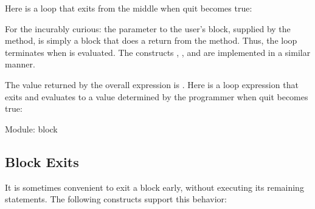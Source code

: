 \documentclass[letterpaper,10pt,english]{sphinxmanual}
\begin{document}
Here is a loop that exits from the middle when quit becomes true:

\begin{sphinxVerbatim}[commandchars=\\\{\}]
\PYG{p}{[}        \PYG{p}{]} 
\end{sphinxVerbatim}

For the incurably curious: the parameter to the user’s block, supplied by the  method, is simply a block that
does a return from the  method. Thus, the loop terminates when  is evaluated. The constructs
, , and  are implemented in a similar manner.

The value returned by the overall  expression is . Here is a loop expression
that exits and evaluates to a value determined by the programmer when quit becomes true:

\begin{sphinxVerbatim}[commandchars=\\\{\}]
\PYG{p}{[}      \PYG{p}{[}    \PYG{p}{]} \PYG{p}{]} 
\end{sphinxVerbatim}

Module: block


\subsection{Block Exits}
\label{\detokenize{blocks:block-exits}}
It is sometimes convenient to exit a block early, without executing its remaining statements. The
following constructs support this behavior:

\begin{sphinxVerbatim}[commandchars=\\\{\}]
\PYG{p}{[}        \PYG{p}{]} 
\PYG{p}{[}      \PYG{p}{[}    \PYG{p}{]}  \PYG{p}{]} 
\end{sphinxVerbatim}
\end{document}
